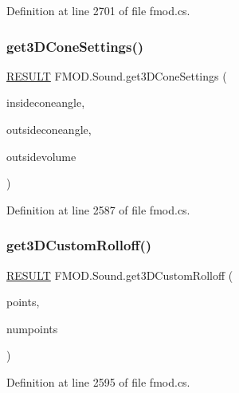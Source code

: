 Definition at line 2701 of file fmod.\+cs.

\mbox{\label{class_f_m_o_d_1_1_sound_a7ce178e6903b29ea584e8619d750e59c}} 
\subsubsection{\texorpdfstring{get3\+D\+Cone\+Settings()}{get3DConeSettings()}}
{\footnotesize\ttfamily \hyperlink{namespace_f_m_o_d_a305d1176ef3f8c8815861a60407ac33d}{R\+E\+S\+U\+LT} F\+M\+O\+D.\+Sound.\+get3\+D\+Cone\+Settings (\begin{DoxyParamCaption}\item[{out float}]{insideconeangle,  }\item[{out float}]{outsideconeangle,  }\item[{out float}]{outsidevolume }\end{DoxyParamCaption})}



Definition at line 2587 of file fmod.\+cs.

\mbox{\label{class_f_m_o_d_1_1_sound_a41fea52587d2ddbf5dc2e7d37f9210e9}} 
\subsubsection{\texorpdfstring{get3\+D\+Custom\+Rolloff()}{get3DCustomRolloff()}}
{\footnotesize\ttfamily \hyperlink{namespace_f_m_o_d_a305d1176ef3f8c8815861a60407ac33d}{R\+E\+S\+U\+LT} F\+M\+O\+D.\+Sound.\+get3\+D\+Custom\+Rolloff (\begin{DoxyParamCaption}\item[{out Int\+Ptr}]{points,  }\item[{out int}]{numpoints }\end{DoxyParamCaption})}



Definition at line 2595 of file fmod.\+cs.

\mbox{\label{class_f_m_o_d_1_1_sound_aadb55c0f0f6769697def6d332e867922}} 
